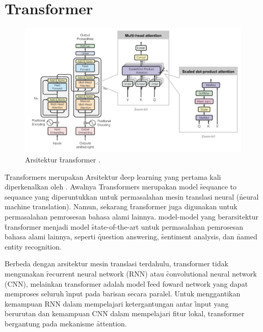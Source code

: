 \section{Transformer}
	\begin{figure}
		\centering
		\includegraphics[width=1\textwidth]{assets/pics/lilianweng-transformer.png}
		\caption{Arsitektur \f{transformer} \citep{weng2018attention}.}
		\label{fig:transformer}
	\end{figure}

	\f{Transformers} merupakan Arsitektur \f{deep learning} yang pertama kali diperkenalkan oleh \cite{transformerori}. Awalnya Transformers merupakan model \f{sequance to sequance} yang diperuntukkan untuk permasalahan mesin translasi neural (\f{neural machine translation}). Namun, sekarang \f{transformer} juga digunakan untuk permasalahan pemrosesan bahasa alami lainnya. model-model yang berarsitektur \f{transformer} menjadi model \f{state-of-the-art} untuk permasalahan pemrosesan bahasa alami lainnya, seperti \f{question answering}, \f{sentiment analysis}, dan \f{named entity recognition}.
 
	Berbeda dengan arsitektur mesin translasi terdahulu, transformer tidak mengunakan \f{recurrent neural network} (RNN) atau \f{convolutional neural network} (CNN), melainkan transformer adalah model \f{feed foward network} yang dapat memproses seluruh \f{input} pada barisan secara paralel. Untuk menggantikan kemampuan RNN dalam mempelajari ketergantungan antar \f{input} yang berurutan dan kemampuan CNN dalam mempelajari fitur lokal, transformer bergantung pada mekanisme \f{attention}.

